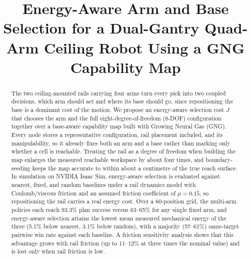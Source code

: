 \documentclass[conference]{IEEEtran}
\begin{document}
\title{Energy-Aware Arm and Base Selection for a Dual-Gantry Quad-Arm Ceiling Robot Using a GNG Capability Map}

\author{
}

\maketitle

\begin{abstract}
The two ceiling-mounted rails carrying four arms turn every pick into two
coupled decisions, which arm should act and where its base should go, since
repositioning the base is a dominant cost of the motion. We propose an
energy-aware selection cost $J$ that chooses the arm and the full
eight-degree-of-freedom (8-DOF) configuration together over a base-aware
capability map built with Growing Neural Gas (GNG). Every node stores a
representative configuration, rail placement included, and its manipulability, so
it already fixes both an arm and a base rather than marking only whether a cell is
reachable. Treating the rail as a degree of freedom when building the map enlarges
the measured reachable workspace by about four times, and boundary-seeding keeps
the map accurate to within about a centimetre of the true reach surface. In
simulation on NVIDIA Isaac Sim, energy-aware selection is evaluated against
nearest, fixed, and random baselines under a rail dynamics model with
Coulomb/viscous friction and an assumed friction coefficient of $\mu=0.15$, so
repositioning the rail carries a real energy cost. Over a 60-position grid, the
multi-arm policies each reach 93.3\% plan success versus 63--65\% for any single
fixed arm, and energy-aware selection attains the lowest mean measured mechanical
energy of the three (5.1\% below nearest, 3.1\% below random), with a majority
(57--61\%) same-target pairwise win rate against each baseline. A friction
sensitivity analysis shows that this advantage grows with rail friction (up to
11--12\% at three times the nominal value) and is lost only when rail friction is low.
\end{abstract}
\end{document}

